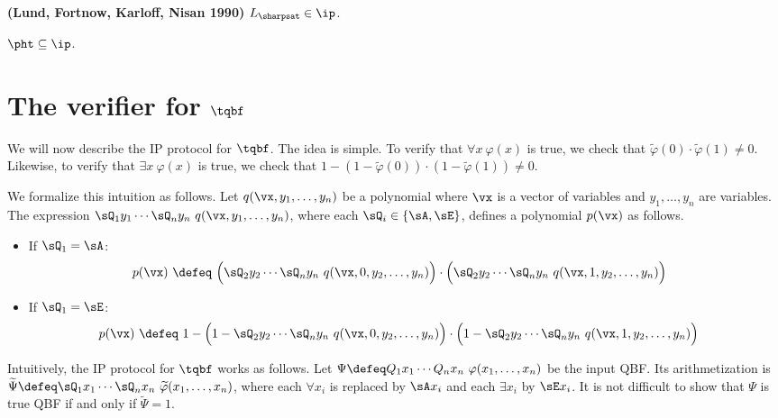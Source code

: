 \documentclass[11pt, a4paper]{article}
\begin{document}
\begin{theorem}
\label{theo:sharpsat-ip}
{\bf (Lund, Fortnow, Karloff, Nisan 1990)}
$L_{\sharpsat}\in \ip$.
\end{theorem}


\begin{corollary}
\label{theo:ph-ip}
$\pht\subseteq \ip$.
\end{corollary}


\section{The verifier for $\tqbf$}

We will now describe the IP protocol for $\tqbf$.
The idea is simple.
To verify that $\forall x\ \varphi(x)$ is true,
we check that $\widetilde{\varphi}(0)\cdot \widetilde{\varphi}(1)\neq 0$.
Likewise, to verify that $\exists x\ \varphi(x)$ is true,
we check that $1- (1-\widetilde{\varphi}(0)) \cdot (1- \widetilde{\varphi}(1))\neq 0$.

We formalize this intuition as follows.
Let $q(\vx,y_1,\ldots,y_n)$ be a polynomial
where $\vx$ is a vector of variables and $y_1,\ldots,y_n$ are variables.
The expression $\sQ_1 y_1\cdots  \sQ_n y_n\ q(\vx,y_1,\ldots,y_n)$,
where each $\sQ_i \in \{\sA,\sE\}$,
defines a polynomial $p(\vx)$ as follows.
\begin{itemize}
\item
If $\sQ_1 = \sA$:
\begin{align*}
p(\vx) & \ \defeq \
\Big(\sQ_2y_2 \cdots \sQ_n y_n \ q(\vx,0,y_2,\ldots,y_n)\Big)\cdot
\Big(\sQ_2y_2 \cdots \sQ_n y_n \ q(\vx,1,y_2,\ldots,y_n)\Big)
\end{align*}
\item 
If $\sQ_1 = \sE$:
\begin{align*}
p(\vx) & \ \defeq \
1 - \Big(1- \sQ_2y_2 \cdots \sQ_n y_n \ q(\vx,0,y_2,\ldots,y_n)\Big)\cdot
\Big(1- \sQ_2y_2 \cdots \sQ_n y_n \ q(\vx,1,y_2,\ldots,y_n)\Big)
\end{align*}
\end{itemize}

Intuitively, the IP protocol for $\tqbf$ works as follows.
Let $\Psi \defeq Q_1x_1\cdots Q_nx_n\ \varphi(x_1,\ldots,x_n)$ be the input QBF.
Its arithmetization is $\widetilde{\Psi} \defeq  \sQ_1x_1\cdots \sQ_nx_n\ \widetilde{\varphi}(x_1,\ldots,x_n)$,
where each $\forall x_i$ is replaced by $\sA x_i$ and each $\exists x_i$ by $\sE x_i$.
It is not difficult to show that $\Psi$ is true QBF if and only if $\widetilde{\Psi}=1$.
\end{document}
